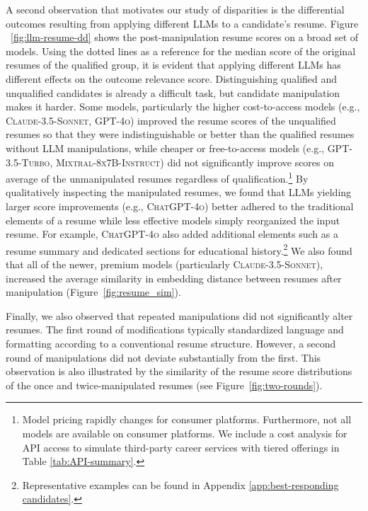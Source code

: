 A second observation that motivates our study of disparities is the differential outcomes resulting from applying different LLMs to a candidate's resume. Figure ~\ref{fig:llm-resume-dd} shows the post-manipulation resume scores on a broad set of models. Using the dotted lines as a reference for the median score of the original resumes of the qualified group, it is evident that applying different LLMs has different effects on the outcome relevance score. Distinguishing qualified and unqualified candidates is already a difficult task, but candidate manipulation makes it harder. Some models, particularly the higher cost-to-access models (e.g., \textsc{Claude-3.5-Sonnet}, \textsc{GPT-4o}) improved the resume scores of the unqualified resumes so that they were indistinguishable or better than the qualified resumes without LLM manipulations, while cheaper or free-to-access models (e.g., \textsc{GPT-3.5-Turbo}, \textsc{Mixtral-8x7B-Instruct}) did not significantly improve scores on average of the unmanipulated resumes regardless of qualification.\footnote{Model pricing rapidly changes for consumer platforms. Furthermore, not all models are available on consumer platforms. We include a cost analysis for API access to simulate third-party career services with tiered offerings in Table \ref{tab:API-summary}.} By qualitatively inspecting the manipulated resumes, we found that LLMs yielding larger score improvements (e.g., \textsc{ChatGPT-4o}) better adhered to the traditional elements of a resume while less effective models simply reorganized the input resume. For example, \textsc{ChatGPT-4o} also added additional elements such as a resume summary and dedicated sections for educational history.\footnote{Representative examples can be found in Appendix \ref{app:best-responding candidates}.} We also found that all of the newer, premium models (particularly \textsc{Claude-3.5-Sonnet}), increased the average similarity in embedding distance between resumes after manipulation (Figure~\ref{fig:resume_sim}). 

Finally, we also observed that repeated manipulations did not significantly alter resumes. %
The first round of modifications typically standardized language and formatting according to a conventional resume structure. However, a second round of manipulations did not deviate substantially from the first. This observation is also illustrated by the similarity of the resume score distributions of the once and twice-manipulated resumes (see Figure~\ref{fig:two-rounds}).  

